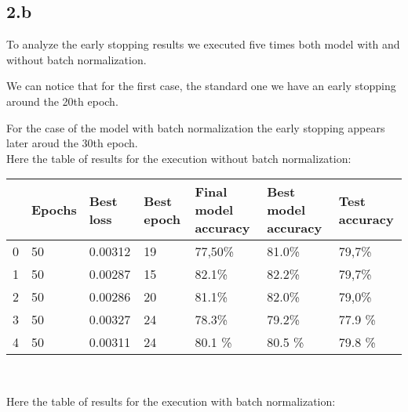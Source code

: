 \documentclass{article}
\begin{document}
\subsection*{2.b}

To analyze the early stopping results we executed five times both model with and without batch normalization. 

We can notice that for the first case, the standard one we have an early stopping around the 20th epoch. 

For the case of the model with batch normalization the early stopping appears later aroud the 30th epoch.\\ 

Here the table of results for the execution without batch normalization:\\


\begin{tabular}{lllllll}

\toprule
{} & Epochs &              Best loss & Best epoch & Final model accuracy & Best model accuracy & Test accuracy \\
\midrule
0 &               50 &  0.00312 &         19 &               77,50\% &               81.0\% &         79,7\% \\
1 &               50 &    0.00287 &         15 &                82.1\% &               82.2\% &         79,7\% \\
2 &               50 &   0.00286 &         20 &                81.1\% &               82.0\% &         79,0\% \\
3 &               50 &   0.00327 &         24 &                78.3\% &               79.2\% &        77.9 \% \\
4 &               50 &  0.00311 &         24 &               80.1 \% &              80.5 \% &        79.8 \% \\
\bottomrule
\end{tabular}\\

\newpage


 
Here the table of results for the execution with batch normalization:\\
\end{document}

